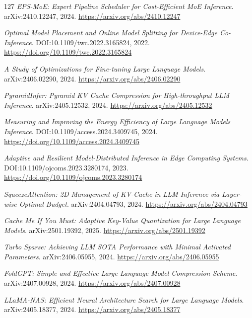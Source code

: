 \documentclass[11pt,a4paper]{article}
\begin{document}
\begin{thebibliography}{127}
\newblock \emph{EPS-MoE: Expert Pipeline Scheduler for Cost-Efficient MoE Inference}.
\newblock arXiv:2410.12247, 2024.
\newblock \url{https://arxiv.org/abs/2410.12247}

\newblock \emph{Optimal Model Placement and Online Model Splitting for Device-Edge Co-Inference}.
\newblock DOI:10.1109/twc.2022.3165824, 2022.
\newblock \url{https://doi.org/10.1109/twc.2022.3165824}

\newblock \emph{A Study of Optimizations for Fine-tuning Large Language Models}.
\newblock arXiv:2406.02290, 2024.
\newblock \url{https://arxiv.org/abs/2406.02290}

\newblock \emph{PyramidInfer: Pyramid KV Cache Compression for High-throughput LLM Inference}.
\newblock arXiv:2405.12532, 2024.
\newblock \url{https://arxiv.org/abs/2405.12532}

\newblock \emph{Measuring and Improving the Energy Efficiency of Large Language Models Inference}.
\newblock DOI:10.1109/access.2024.3409745, 2024.
\newblock \url{https://doi.org/10.1109/access.2024.3409745}

\newblock \emph{Adaptive and Resilient Model-Distributed Inference in Edge Computing Systems}.
\newblock DOI:10.1109/ojcoms.2023.3280174, 2023.
\newblock \url{https://doi.org/10.1109/ojcoms.2023.3280174}

\newblock \emph{SqueezeAttention: 2D Management of KV-Cache in LLM Inference via Layer-wise Optimal Budget}.
\newblock arXiv:2404.04793, 2024.
\newblock \url{https://arxiv.org/abs/2404.04793}

\newblock \emph{Cache Me If You Must: Adaptive Key-Value Quantization for Large Language Models}.
\newblock arXiv:2501.19392, 2025.
\newblock \url{https://arxiv.org/abs/2501.19392}

\newblock \emph{Turbo Sparse: Achieving LLM SOTA Performance with Minimal Activated Parameters}.
\newblock arXiv:2406.05955, 2024.
\newblock \url{https://arxiv.org/abs/2406.05955}

\newblock \emph{FoldGPT: Simple and Effective Large Language Model Compression Scheme}.
\newblock arXiv:2407.00928, 2024.
\newblock \url{https://arxiv.org/abs/2407.00928}

\newblock \emph{LLaMA-NAS: Efficient Neural Architecture Search for Large Language Models}.
\newblock arXiv:2405.18377, 2024.
\newblock \url{https://arxiv.org/abs/2405.18377}


\end{thebibliography}
\end{document}
